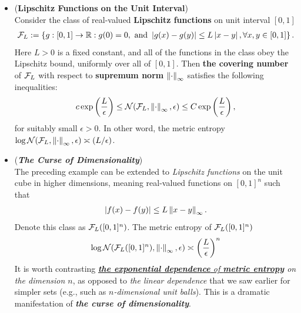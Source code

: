 \documentclass[11pt]{article}
\begin{document}
\begin{itemize}
\item \begin{proposition}(\textbf{Lipschitz Functions on the Unit Interval}) \citep{wainwright2019high}\\
Consider the class of real-valued \textbf{Lipschitz functions} on unit interval $[0, 1]$
\begin{align*}
{\mathcal F}_L := \left\{g: [0, 1] \to {\mathbb R}:  g(0) = 0,\text{ and }\left\lvert g(x) - g(y) \right\rvert \le L \left\lvert x -y \right\rvert, \forall x, y \in  [0, 1]\right\}.
\end{align*}
 Here $L > 0$ is a fixed constant, and all of the functions in the class obey the Lipschitz bound, uniformly over all of $[0, 1]$.  Then \textbf{the covering number} of ${\mathcal F}_L$ with respect to \textbf{supremum norm} $\left\|\cdot\right\|_{\infty}$ satisfies the following inequalities:
 \begin{align}
 c \exp\left(\frac{L}{\epsilon}\right) \le  {\mathcal N}({\mathcal F}_L,  \left\|\cdot\right\|_{\infty}, \epsilon)  \le C \exp\left(\frac{L}{\epsilon}\right), \label{ineqn: cover_num_vol_lipschitz_sup_norm}
 \end{align} for suitably small $\epsilon >0$. In other word, the metric entropy $\log {\mathcal N}({\mathcal F}_L,  \left\|\cdot\right\|_{\infty}, \epsilon) \asymp (L/\epsilon)$.
 \end{proposition}
 
 \item \begin{remark}(\textbf{\emph{The Curse of Dimensionality}})\\
 The preceding example can be extended to \emph{Lipschitz functions} on the unit cube in higher dimensions, meaning real-valued functions on $[0, 1]^n$ such that 
 \begin{align*}
 \left\lvert f(x) - f(y) \right\rvert \le L \left\|x -y\right\|_{\infty}.
 \end{align*} Denote this class as ${\mathcal F}_{L}([0,1]^n)$. The metric entropy of ${\mathcal F}_{L}([0,1]^n)$ 
 \begin{align}
\log  {\mathcal N}({\mathcal F}_L([0,1]^n),  \left\|\cdot\right\|_{\infty}, \epsilon) \asymp \left(\frac{L}{\epsilon}\right)^n \label{ineqn: cover_num_vol_lipschitz_sup_norm_high_dim}
 \end{align} It is worth contrasting \emph{\underline{\textbf{the exponential dependence} of \textbf{metric entropy}} on the dimension $n$}, as opposed to\emph{ the linear dependence} that we saw earlier for simpler sets (e.g., such as \emph{$n$-dimensional unit balls}). This is a dramatic manifestation of \emph{\textbf{the curse of dimensionality}}.
 \end{remark}
\end{itemize}
\end{document}
